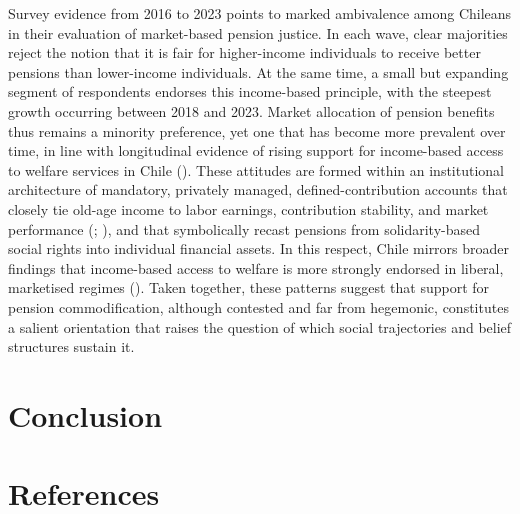 \documentclass[
  12pt,
]{article}
\begin{document}
Survey evidence from 2016 to 2023 points to marked ambivalence among
Chileans in their evaluation of market-based pension justice. In each
wave, clear majorities reject the notion that it is fair for
higher-income individuals to receive better pensions than lower-income
individuals. At the same time, a small but expanding segment of
respondents endorses this income-based principle, with the steepest
growth occurring between 2018 and 2023. Market allocation of pension
benefits thus remains a minority preference, yet one that has become
more prevalent over time, in line with longitudinal evidence of rising
support for income-based access to welfare services in Chile
(). These attitudes are formed within an institutional architecture
of mandatory, privately managed, defined-contribution accounts that
closely tie old-age income to labor earnings, contribution stability,
and market performance
(;
), and that
symbolically recast pensions from solidarity-based social rights into
individual financial assets. In this respect, Chile mirrors broader
findings that income-based access to welfare is more strongly endorsed
in liberal, marketised regimes (). Taken together, these patterns suggest that support for pension
commodification, although contested and far from hegemonic, constitutes
a salient orientation that raises the question of which social
trajectories and belief structures sustain it.

\section{Conclusion}\label{conclusion}

\section{References}\label{references}
\end{document}
